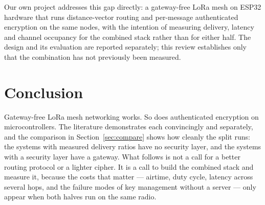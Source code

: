 \documentclass[conference]{IEEEtran}
\begin{document}
Our own project addresses this gap directly: a gateway-free LoRa mesh on ESP32
hardware that runs distance-vector routing and per-message authenticated
encryption on the same nodes, with the intention of measuring delivery, latency
and channel occupancy for the combined stack rather than for either half. The
design and its evaluation are reported separately; this review establishes only
that the combination has not previously been measured.

\section{Conclusion}

Gateway-free LoRa mesh networking works. So does authenticated encryption on
microcontrollers. The literature demonstrates each convincingly and separately,
and the comparison in Section~\ref{sec:compare} shows how cleanly the split runs:
the systems with measured delivery ratios have no security layer, and the systems
with a security layer have a gateway. What follows is not a call for a better
routing protocol or a lighter cipher. It is a call to build the combined stack
and measure it, because the costs that matter — airtime, duty cycle, latency
across several hops, and the failure modes of key management without a server —
only appear when both halves run on the same radio.



\end{document}

